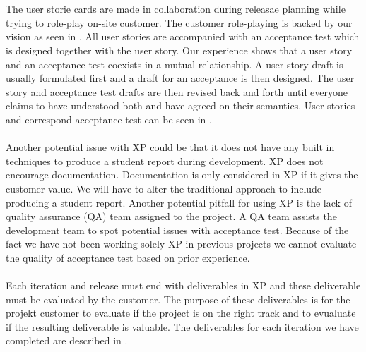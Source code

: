 \\\\
The user storie cards are made in collaboration during releasae planning while trying to role-play on-site customer. The customer role-playing is backed by our vision as seen in . All user stories are accompanied with an acceptance test which is designed together with the user story. Our experience shows that a user story and an acceptance test coexists in a mutual relationship. A user story draft is usually formulated first and a draft for an acceptance is then designed. The user story and acceptance test drafts are then revised back and forth until everyone claims to have understood both and have agreed on their semantics. User stories and correspond acceptance test can be seen in .
\\\\
Another potential issue with XP could be that it does not have any built in techniques to produce a student report during development. XP does not encourage documentation. Documentation is only considered in XP if it gives the customer value. We will have to alter the traditional approach to include producing a student report. Another potential pitfall for using XP is the lack of quality assurance (QA) team assigned to the project. A QA team assists the development team to spot potential issues with acceptance test. Because of the fact we have not been working solely XP in previous projects we cannot evaluate the quality of acceptance test based on prior experience.
\\\\
Each iteration and release must end with deliverables in XP and these deliverable must be evaluated by the customer. The purpose of these deliverables is for the projekt customer to evaluate if the project is on the right track and to evualuate if the resulting deliverable is valuable. The deliverables for each iteration we have completed are described in .


